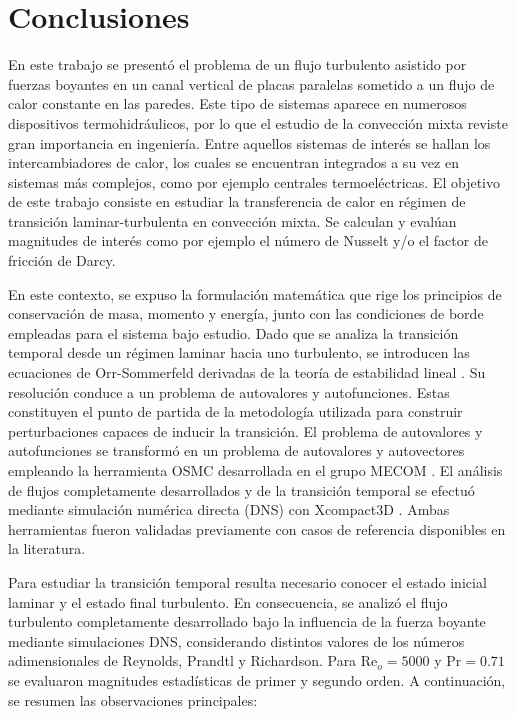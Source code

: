 \chapter{Conclusiones} \label{cap:conclusiones}

En este trabajo se presentó el problema de un flujo turbulento asistido por fuerzas \linebreak boyantes en un canal vertical de placas paralelas sometido a un flujo de calor constante en las paredes. Este tipo de sistemas aparece en numerosos dispositivos termohidráulicos, por lo que el estudio de la convección mixta reviste gran importancia en ingeniería. Entre aquellos sistemas de interés se hallan los intercambiadores de calor, los cuales se encuentran integrados a su vez en sistemas más complejos, como por ejemplo centrales termoeléctricas. El objetivo de este trabajo consiste en estudiar la transferencia de calor en régimen de transición laminar-turbulenta en convección mixta. Se calculan y evalúan magnitudes de interés como por ejemplo el número de Nusselt y/o el factor de fricción de Darcy.

En este contexto, se expuso la formulación matemática que rige los principios de conservación de masa, momento y energía, junto con las condiciones de borde empleadas para el sistema bajo estudio. Dado que se analiza la transición temporal desde un régimen \linebreak laminar hacia uno turbulento, se introducen las ecuaciones de Orr-Sommerfeld derivadas de la teoría de estabilidad lineal \cite{chen1996linear}. Su resolución conduce a un problema de autovalores y autofunciones. Estas constituyen el punto de partida de la metodología utilizada para construir perturbaciones capaces de inducir la transición. El problema de autovalores y autofunciones se transformó en un problema de autovalores y autovectores empleando la herramienta OSMC desarrollada en el grupo MECOM \cite{szuban2023}. El análisis de flujos completamente desarrollados y de la transición temporal se efectuó mediante simulación numérica directa (DNS) con Xcompact3D \cite{bartholomew2020xcompact3d}. Ambas herramientas fueron validadas previamente con casos de referencia disponibles en la literatura.

Para estudiar la transición temporal resulta necesario conocer el estado inicial laminar y el estado final turbulento. En consecuencia, se analizó el flujo turbulento completamente desarrollado bajo la influencia de la fuerza boyante mediante simulaciones DNS, considerando distintos valores de los números adimensionales de Reynolds, Prandtl y Richardson. Para $\text{Re}_o=5000$ y $\text{Pr}=0\text{.}71$ se evaluaron magnitudes estadísticas de primer y segundo orden. A continuación, se resumen las observaciones principales:

